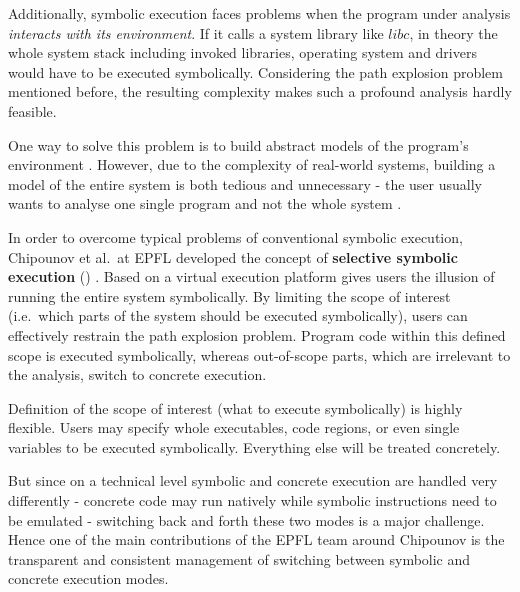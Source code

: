 Additionally, symbolic execution faces problems when the program under analysis \textit{interacts with its environment}.
If it calls a system library like $libc$, in theory the whole system stack including invoked libraries, operating system and drivers would have to be executed symbolically.
Considering the path explosion problem mentioned before, the resulting complexity makes such a profound analysis hardly feasible.

One way to solve this problem is to build abstract models of the program's environment \cite{klee08, nasa08}.
However, due to the complexity of real-world systems, building a model of the entire system is both tedious and unnecessary - the user usually wants to analyse one single program and not the whole system \cite{chip09sel}.

\bigskip

In order to overcome typical problems of conventional symbolic execution, Chipounov et al.~at EPFL developed the concept of \textbf{selective symbolic execution} (\sse) \cite{chip09sel}.
Based on a virtual execution platform \sse gives users the illusion of running the entire system symbolically.
By limiting the scope of interest (i.e.~which parts of the system should be executed symbolically), users can effectively restrain the path explosion problem.
Program code within this defined scope is executed symbolically, whereas out-of-scope parts, which are irrelevant to the analysis, switch to concrete execution.


Definition of the scope of interest (what to execute symbolically) is highly flexible.
Users may specify whole executables, code regions, or even single variables to be executed symbolically. Everything else will be treated concretely.

But since on a technical level symbolic and concrete execution are handled very differently - concrete code may run natively while symbolic instructions need to be emulated - switching back and forth these two modes is a major challenge.
Hence one of the main contributions of the EPFL team around Chipounov is the transparent and consistent management of switching between symbolic and concrete execution modes.

